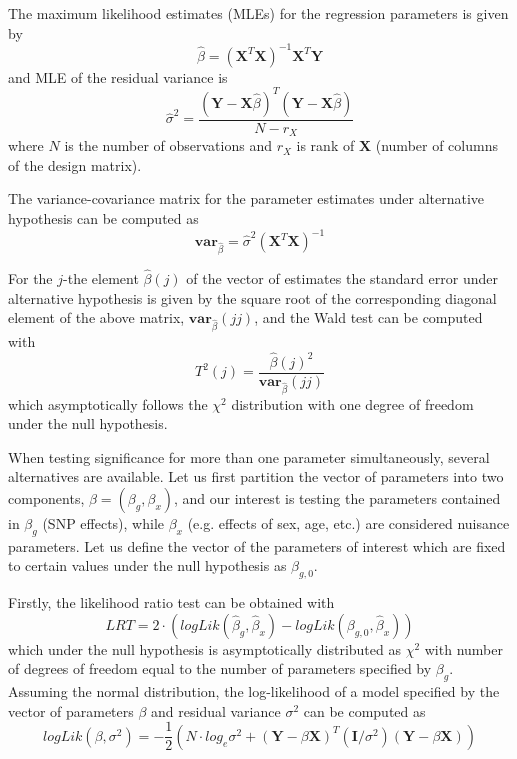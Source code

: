 \documentclass[12pt]{article}
\begin{document}
The maximum likelihood estimates (MLEs) for the regression parameters 
is given by
\begin{equation}
\hat{\beta} = (\mathbf{X}^T \mathbf{X})^{-1} \mathbf{X}^T \mathbf{Y}
\end{equation}
and MLE of the residual variance is
\begin{equation}
\hat{\sigma}^2 = \frac{(\mathbf{Y} - \mathbf{X}\hat{\beta})^T (\mathbf{Y} - \mathbf{X}\hat{\beta})}
			{N-r_X}
\end{equation}
where $N$ is the number of observations and $r_X$ is rank of $\mathbf{X}$ 
(number of columns of the design matrix). 

The variance-covariance matrix for the parameter estimates under 
alternative hypothesis can be 
computed as 
\begin{equation}
\mathbf{var}_{\hat{\beta}} = \hat{\sigma}^2 (\mathbf{X}^T\mathbf{X})^{-1}
\end{equation}

For the $j$-the element $\hat{\beta}(j)$ of the vector of estimates the standard 
error under alternative hypothesis is given by the square root of the 
corresponding diagonal element of the above matrix, $\mathbf{var}_{\hat{\beta}}(jj)$,
and the Wald test can be computed with
$$
T^2(j) = \frac{ \hat{\beta}(j)^2 }{ \mathbf{var}_{\hat{\beta}}(jj) }
$$
which asymptotically follows the $\chi^2$ distribution with one degree of 
freedom under the null hypothesis. 

When testing significance for more than one parameter simultaneously, 
several alternatives are available. Let us first partition the vector of 
parameters into two components, $\beta = (\beta_g,\beta_x)$, and our 
interest is testing the parameters contained in $\beta_g$ (SNP effects), 
while $\beta_x$ (e.g. effects of sex, age, etc.) are considered nuisance 
parameters. Let us define the vector of the parameters of interest 
which are fixed to certain values under the null hypothesis as $\beta_{g,0}$. 

Firstly, the likelihood ratio test can be obtained with
$$
LRT = 2 \cdot (logLik(\hat{\beta}_g,\hat{\beta}_x) - logLik(\beta_{g,0},\hat{\beta}_x))
$$
which under the null hypothesis is asymptotically distributed as $\chi^2$ with 
number of degrees of freedom equal to the number of parameters specified 
by $\beta_g$. Assuming the normal distribution, the log-likelihood of a 
model specified by the vector of parameters $\beta$ and residual variance 
$\sigma^2$ can be computed as
$$
logLik(\beta,\sigma^2) = 
-\frac{1}{2} ( N \cdot log_e \sigma^2 +
(\mathbf{Y} - \beta \mathbf{X})^T (\mathbf{I}/\sigma^2) (\mathbf{Y} - \beta \mathbf{X}) )
$$
\end{document}
